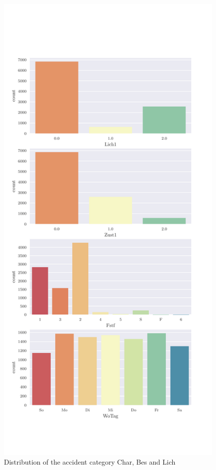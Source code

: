 \begin{appendices}
    \begin{figure}[!ht]
        \centering
        \includegraphics[scale=0.7]{CorrAnalysis/data/BAYSIS/01_dataset/plots/baysis_dataset_count_multiple03}
        \caption{Distribution of the accident category Char, Bes and Lich}
        \label{img:appendix_baysis_dataset_Char_Bes_Lich}
    \end{figure}


\end{appendices}
